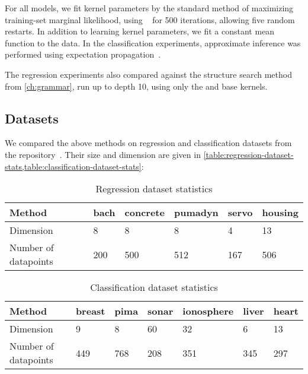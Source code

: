 For all \gp{} models, we fit kernel parameters by the standard method of maximizing training-set marginal likelihood, using \LBFGS{}~\citep{nocedal1980updating} for 500 iterations, allowing five random restarts.
In addition to learning kernel parameters, we fit a constant mean function to the data.
In the classification experiments, approximate \gp{} inference was performed using expectation propagation~\citep{minka2001expectation}.

The regression experiments also compared against the structure search method from \cref{ch:grammar}, run up to depth 10, using only the \SE{} and \RQ{} base kernels.



\subsection{Datasets}

We compared the above methods on regression and classification datasets from the \UCI{} repository~\citep{UCI}.
Their size and dimension are given in \cref{table:regression-dataset-stats,table:classification-dataset-stats}:

\begin{table}[h]
\caption{Regression dataset statistics}
\label{tbl:Regression Dataset Statistics}
\begin{center}
\begin{tabular}{l | lllll}
Method & bach & concrete & pumadyn & servo & housing \\ \hline
Dimension      & 8    & 8        & 8       & 4     & 13 \\
Number of datapoints       & 200  & 500      & 512     & 167   & 506
\end{tabular}
\end{center}
\label{table:regression-dataset-stats}
\end{table}
%
\begin{table}[h]
\caption{Classification dataset statistics}
\label{tbl:Classification Dataset Statistics}
\begin{center}
\begin{tabular}{l | llllll}
Method & breast & pima & sonar & ionosphere & liver & heart\\ \hline
Dimension      & 9      & 8    & 60    & 32         & 6     & 13 \\
Number of datapoints      & 449    & 768  & 208   & 351        & 345   & 297
\end{tabular}
\end{center}
\label{table:classification-dataset-stats}
\end{table}

